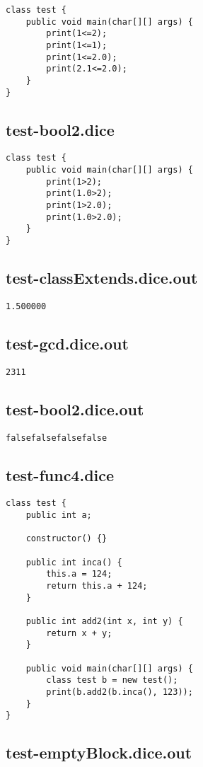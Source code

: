\begin{verbatim}
class test {
	public void main(char[][] args) {
		print(1<=2);
		print(1<=1);
		print(1<=2.0);
		print(2.1<=2.0);
	}
}
\end{verbatim}\pagebreak\subsection{test-bool2.dice}
\begin{verbatim}
class test {
	public void main(char[][] args) {
		print(1>2);
		print(1.0>2);
		print(1>2.0);
		print(1.0>2.0);
	}
}
\end{verbatim}\pagebreak\subsection{test-classExtends.dice.out}
\begin{verbatim}
1.500000
\end{verbatim}\pagebreak\subsection{test-gcd.dice.out}
\begin{verbatim}
2311
\end{verbatim}\pagebreak\subsection{test-bool2.dice.out}
\begin{verbatim}
falsefalsefalsefalse
\end{verbatim}\pagebreak\subsection{test-func4.dice}
\begin{verbatim}
class test {
	public int a;

	constructor() {}

	public int inca() { 
		this.a = 124;
		return this.a + 124; 
	} 

	public int add2(int x, int y) {
		return x + y;
	}

	public void main(char[][] args) {
		class test b = new test();
	  	print(b.add2(b.inca(), 123));
	}
}

\end{verbatim}\pagebreak\subsection{test-emptyBlock.dice.out}
